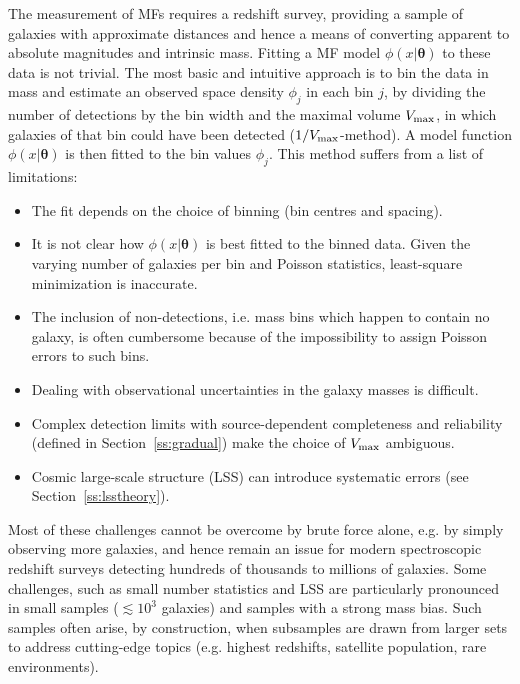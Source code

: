 \documentclass[a4paper,fleqn,usenatbib]{mnras}
\newcommand{\bi}{\begin{itemize}[leftmargin=3.5mm]\setlength{\itemindent}{-1.6mm}}
\newcommand{\ei}{\end{itemize}}
\newcommand{\vmax}{V_{\rm max}}
\renewcommand{\ss}[1]{Section~\ref{ss:#1}}
\newcommand{\ie}{i.e.\xspace}
\newcommand{\eg}{e.g.\xspace}
\newcommand{\para}{{\bm{\theta}}}
\begin{document}
The measurement of MFs requires a redshift survey, providing a sample of galaxies with approximate distances and hence a means of converting apparent to absolute magnitudes and intrinsic mass. Fitting a MF model $\phi(x|\para)$ to these data is not trivial. The most basic and intuitive approach \citep{Schmidt1968} is to bin the data in mass and estimate an observed space density $\phi_j$ in each bin $j$, by dividing the number of detections by the bin width and the maximal volume $\vmax$, in which galaxies of that bin could have been detected ($1/\vmax$-method). A model function $\phi(x|\para)$ is then fitted to the bin values $\phi_j$. This method suffers from a list of limitations:
%
\bi
	\item The fit depends on the choice of binning (bin centres and spacing).
	\item It is not clear how $\phi(x|\para)$ is best fitted to the binned data. Given the varying number of galaxies per bin and Poisson statistics, least-square minimization is inaccurate.
	\item The inclusion of non-detections, \ie mass bins which happen to contain no galaxy, is often cumbersome because of the impossibility to assign Poisson errors to such bins.
	\item Dealing with observational uncertainties in the galaxy masses is difficult.
	\item Complex detection limits with source-dependent completeness and reliability (defined in \ss{gradual}) make the choice of $\vmax$ ambiguous.
	\item Cosmic large-scale structure (LSS) can introduce systematic errors (see \ss{lsstheory}).
\ei

Most of these challenges cannot be overcome by brute force alone, \eg by simply observing more galaxies, and hence remain an issue for modern spectroscopic redshift surveys detecting hundreds of thousands  \citep{Colless2001,York2000,Liske2015,Drinkwater2010,Grazian2015,Davidzon2017} to millions \citep{Dawson2013,Amiaux2012} of galaxies. Some challenges, such as small number statistics and LSS are particularly pronounced in small samples ($\lesssim10^3$ galaxies) and samples with a strong mass bias. Such samples often arise, by construction, when subsamples are drawn from larger sets to address cutting-edge topics (\eg highest redshifts, satellite population, rare environments).
\end{document}
